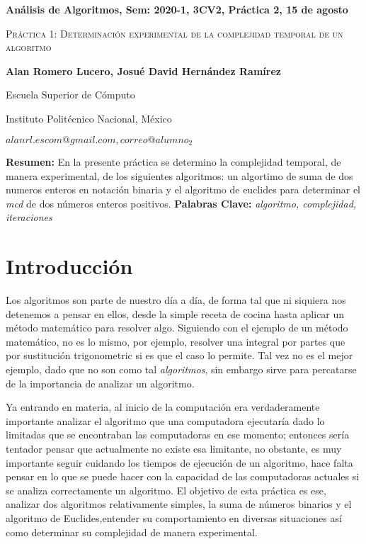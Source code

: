 \documentclass[12pt,twoside]{article}
\date{}
\begin{document}
\centerline{\bf An\'alisis de Algoritmos, Sem: 2020-1, 3CV2, Pr\'actica 2, 15 de agosto}
\centerline{}
\centerline{}
\begin{center}
\Large{\textsc{Pr\'actica 1: Determinaci\'on experimental de la complejidad temporal de un
algoritmo}}
\end{center}
\centerline{}
\centerline{\bf {Alan Romero Lucero, Josué David Hernández Ramírez}}
\centerline{}
\centerline{Escuela Superior de C\'omputo}
\centerline{Instituto Polit\'ecnico Nacional, M\'exico}
\centerline{$alanrl.escom@gmail.com, correo@alumno_2$}
\newtheorem{Theorem}{\quad Theorem}[section]
\newtheorem{Definition}[Theorem]{\quad Definition}
\newtheorem{Corollary}[Theorem]{\quad Corollary}
\newtheorem{Lemma}[Theorem]{\quad Lemma}
\newtheorem{Example}[Theorem]{\quad Example}
\bigskip
\textbf{Resumen:} En la presente pr\'actica se determino la complejidad temporal, de manera experimental, de los siguientes algoritmos: un algortimo de suma de dos numeros enteros en notaci\'on binaria y el algoritmo de euclides para determinar el \textit{mcd} de dos n\'umeros enteros positivos.
{\bf Palabras Clave:} {\textit{algoritmo, complejidad, iteraciones}}
\section{Introducci\'on}
Los algoritmos son parte de nuestro d\'ia a d\'ia, de forma tal que ni siquiera nos detenemos a pensar en ellos, desde la simple receta de cocina hasta aplicar un m\'etodo matemático para resolver algo. Siguiendo con el ejemplo de un m\'etodo matemático, no es lo mismo, por ejemplo, resolver una integral por partes que por sustituci\'on trigonometric si es que el caso lo permite. Tal vez no es el mejor ejemplo, dado que no son como tal \textit{algoritmos}, sin embargo sirve para percatarse de la importancia de analizar un algoritmo.

Ya entrando en materia, al inicio de la computaci\'on era verdaderamente importante analizar el algoritmo que una computadora ejecutaría dado lo limitadas que se encontraban las computadoras en ese momento; entonces ser\'ia tentador pensar que actualmente no existe esa limitante, no obstante, es muy importante seguir cuidando los tiempos de ejecuci\'on de un algoritmo, hace falta pensar en lo que se puede hacer con la capacidad de las computadoras actuales si se analiza correctamente un algoritmo. El objetivo de esta pr\'actica es ese, analizar dos algoritmos relativamente simples, la suma de números binarios y el algoritmo de Euclides,entender su comportamiento en diversas situaciones as\'i como determinar su complejidad de manera experimental.
\end{document}
